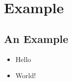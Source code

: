\section{Example}

\subsection{An Example}

\begin{slide}
  \begin{itemize}
    \item<1->
      Hello

    \item<2->
      World!
  \end{itemize}
\end{slide}
